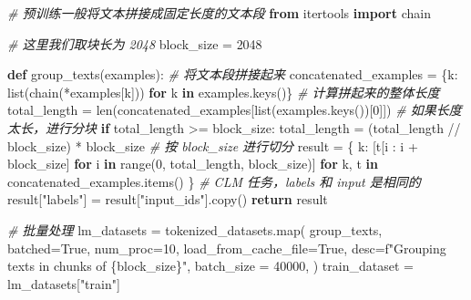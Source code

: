 \documentclass[
]{article}
\newenvironment{Shaded}{}{}
\newcommand{\BuiltInTok}[1]{\textcolor[rgb]{0.00,0.50,0.00}{#1}}
\newcommand{\CommentTok}[1]{\textcolor[rgb]{0.38,0.63,0.69}{\textit{#1}}}
\newcommand{\ControlFlowTok}[1]{\textcolor[rgb]{0.00,0.44,0.13}{\textbf{#1}}}
\newcommand{\DecValTok}[1]{\textcolor[rgb]{0.25,0.63,0.44}{#1}}
\newcommand{\ImportTok}[1]{\textcolor[rgb]{0.00,0.50,0.00}{\textbf{#1}}}
\newcommand{\KeywordTok}[1]{\textcolor[rgb]{0.00,0.44,0.13}{\textbf{#1}}}
\newcommand{\NormalTok}[1]{#1}
\newcommand{\OperatorTok}[1]{\textcolor[rgb]{0.40,0.40,0.40}{#1}}
\newcommand{\SpecialCharTok}[1]{\textcolor[rgb]{0.25,0.44,0.63}{#1}}
\newcommand{\SpecialStringTok}[1]{\textcolor[rgb]{0.73,0.40,0.53}{#1}}
\newcommand{\StringTok}[1]{\textcolor[rgb]{0.25,0.44,0.63}{#1}}
\newcommand{\VariableTok}[1]{\textcolor[rgb]{0.10,0.09,0.49}{#1}}
\begin{document}
\begin{Shaded}
\begin{Highlighting}[]
\CommentTok{\# 预训练一般将文本拼接成固定长度的文本段}
\ImportTok{from}\NormalTok{ itertools }\ImportTok{import}\NormalTok{ chain}

\CommentTok{\# 这里我们取块长为 2048}
\NormalTok{block\_size }\OperatorTok{=} \DecValTok{2048}

\KeywordTok{def}\NormalTok{ group\_texts(examples):}
    \CommentTok{\# 将文本段拼接起来}
\NormalTok{    concatenated\_examples }\OperatorTok{=}\NormalTok{ \{k: }\BuiltInTok{list}\NormalTok{(chain(}\OperatorTok{*}\NormalTok{examples[k])) }\ControlFlowTok{for}\NormalTok{ k }\KeywordTok{in}\NormalTok{ examples.keys()\}}
    \CommentTok{\# 计算拼起来的整体长度}
\NormalTok{    total\_length }\OperatorTok{=} \BuiltInTok{len}\NormalTok{(concatenated\_examples[}\BuiltInTok{list}\NormalTok{(examples.keys())[}\DecValTok{0}\NormalTok{]])}
    \CommentTok{\# 如果长度太长，进行分块}
    \ControlFlowTok{if}\NormalTok{ total\_length }\OperatorTok{\textgreater{}=}\NormalTok{ block\_size:}
\NormalTok{        total\_length }\OperatorTok{=}\NormalTok{ (total\_length }\OperatorTok{//}\NormalTok{ block\_size) }\OperatorTok{*}\NormalTok{ block\_size}
    \CommentTok{\# 按 block\_size 进行切分}
\NormalTok{    result }\OperatorTok{=}\NormalTok{ \{}
\NormalTok{        k: [t[i : i }\OperatorTok{+}\NormalTok{ block\_size] }\ControlFlowTok{for}\NormalTok{ i }\KeywordTok{in} \BuiltInTok{range}\NormalTok{(}\DecValTok{0}\NormalTok{, total\_length, block\_size)]}
        \ControlFlowTok{for}\NormalTok{ k, t }\KeywordTok{in}\NormalTok{ concatenated\_examples.items()}
\NormalTok{    \}}
    \CommentTok{\# CLM 任务，labels 和 input 是相同的}
\NormalTok{    result[}\StringTok{"labels"}\NormalTok{] }\OperatorTok{=}\NormalTok{ result[}\StringTok{"input\_ids"}\NormalTok{].copy()}
    \ControlFlowTok{return}\NormalTok{ result}

\CommentTok{\# 批量处理}
\NormalTok{lm\_datasets }\OperatorTok{=}\NormalTok{ tokenized\_datasets.}\BuiltInTok{map}\NormalTok{(}
\NormalTok{    group\_texts,}
\NormalTok{    batched}\OperatorTok{=}\VariableTok{True}\NormalTok{,}
\NormalTok{    num\_proc}\OperatorTok{=}\DecValTok{10}\NormalTok{,}
\NormalTok{    load\_from\_cache\_file}\OperatorTok{=}\VariableTok{True}\NormalTok{,}
\NormalTok{    desc}\OperatorTok{=}\SpecialStringTok{f"Grouping texts in chunks of }\SpecialCharTok{\{}\NormalTok{block\_size}\SpecialCharTok{\}}\SpecialStringTok{"}\NormalTok{,}
\NormalTok{    batch\_size }\OperatorTok{=} \DecValTok{40000}\NormalTok{,}
\NormalTok{)}
\NormalTok{train\_dataset }\OperatorTok{=}\NormalTok{ lm\_datasets[}\StringTok{"train"}\NormalTok{]}
\end{Highlighting}
\end{Shaded}
\end{document}
